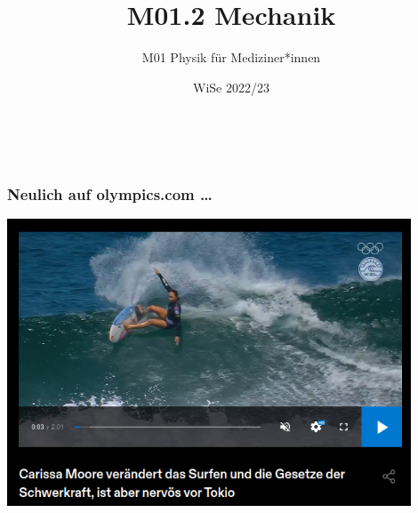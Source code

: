 \documentclass{beamer}
\title[M01.2 Mechanik]{M01.2 Mechanik}
\author[melanie.stefan@medicalschool-berlin.de]{M01 Physik für Mediziner*innen}
\institute[]{Prof. Melanie Stefan - melanie.stefan@medcialschool-berlin.de}
\date{WiSe 2022/23}
\begin{document}
 


 {  
\begin{frame}

 \maketitle 

$\,$\\[6cm] 


\end{frame} 
}
 


\begin{frame}
\frametitle{Neulich auf  olympics.com \dots}

\begin{center}
\includegraphics[width=0.9\textwidth]{surfen_schwerkraft.png}
\end{center}

 
\end{frame}
\end{document}
